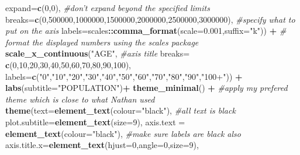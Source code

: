 \documentclass[]{article}
\newenvironment{Shaded}{\begin{snugshade}}{\end{snugshade}}
\newcommand{\KeywordTok}[1]{\textcolor[rgb]{0.13,0.29,0.53}{\textbf{#1}}}
\newcommand{\DataTypeTok}[1]{\textcolor[rgb]{0.13,0.29,0.53}{#1}}
\newcommand{\DecValTok}[1]{\textcolor[rgb]{0.00,0.00,0.81}{#1}}
\newcommand{\FloatTok}[1]{\textcolor[rgb]{0.00,0.00,0.81}{#1}}
\newcommand{\StringTok}[1]{\textcolor[rgb]{0.31,0.60,0.02}{#1}}
\newcommand{\CommentTok}[1]{\textcolor[rgb]{0.56,0.35,0.01}{\textit{#1}}}
\newcommand{\OperatorTok}[1]{\textcolor[rgb]{0.81,0.36,0.00}{\textbf{#1}}}
\newcommand{\NormalTok}[1]{#1}
\begin{document}
\begin{Shaded}
\begin{Highlighting}[]
{                     \DataTypeTok{expand=}\KeywordTok{c}\NormalTok{(}\DecValTok{0}\NormalTok{,}\DecValTok{0}\NormalTok{), }\CommentTok{#don't expand beyond the specified limits}
                     \DataTypeTok{breaks=}\KeywordTok{c}\NormalTok{(}\DecValTok{0}\NormalTok{,}\DecValTok{500000}\NormalTok{,}\DecValTok{1000000}\NormalTok{,}\DecValTok{1500000}\NormalTok{,}\DecValTok{2000000}\NormalTok{,}\DecValTok{2500000}\NormalTok{,}\DecValTok{3000000}\NormalTok{), }\CommentTok{#specify what to put on the axis}
                     \DataTypeTok{labels=}\NormalTok{scales}\OperatorTok{::}\KeywordTok{comma_format}\NormalTok{(}\DataTypeTok{scale=}\FloatTok{0.001}\NormalTok{,}\DataTypeTok{suffix=}\StringTok{"k"}\NormalTok{)) }\OperatorTok{+}\StringTok{ }\CommentTok{# format the displayed numbers using the scales package}
\StringTok{  }\KeywordTok{scale_x_continuous}\NormalTok{(}\StringTok{"AGE"}\NormalTok{, }\CommentTok{#axis title}
                     \DataTypeTok{breaks=} \KeywordTok{c}\NormalTok{(}\DecValTok{0}\NormalTok{,}\DecValTok{10}\NormalTok{,}\DecValTok{20}\NormalTok{,}\DecValTok{30}\NormalTok{,}\DecValTok{40}\NormalTok{,}\DecValTok{50}\NormalTok{,}\DecValTok{60}\NormalTok{,}\DecValTok{70}\NormalTok{,}\DecValTok{80}\NormalTok{,}\DecValTok{90}\NormalTok{,}\DecValTok{100}\NormalTok{),}
                     \DataTypeTok{labels=}\KeywordTok{c}\NormalTok{(}\StringTok{"0"}\NormalTok{,}\StringTok{"10"}\NormalTok{,}\StringTok{"20"}\NormalTok{,}\StringTok{"30"}\NormalTok{,}\StringTok{"40"}\NormalTok{,}\StringTok{"50"}\NormalTok{,}\StringTok{"60"}\NormalTok{,}\StringTok{"70"}\NormalTok{,}\StringTok{"80"}\NormalTok{,}\StringTok{"90"}\NormalTok{,}\StringTok{"100+"}\NormalTok{)) }\OperatorTok{+}
\StringTok{  }\KeywordTok{labs}\NormalTok{(}\DataTypeTok{subtitle=}\StringTok{"POPULATION"}\NormalTok{)}\OperatorTok{+}
\StringTok{  }\KeywordTok{theme_minimal}\NormalTok{() }\OperatorTok{+}\StringTok{ }\CommentTok{#apply my prefered theme which is close to what Nathan used}
\StringTok{  }\KeywordTok{theme}\NormalTok{(}\DataTypeTok{text=}\KeywordTok{element_text}\NormalTok{(}\DataTypeTok{colour=}\StringTok{"black"}\NormalTok{), }\CommentTok{#all text is black}
        \DataTypeTok{plot.subtitle=}\KeywordTok{element_text}\NormalTok{(}\DataTypeTok{size=}\DecValTok{9}\NormalTok{),}
        \DataTypeTok{axis.text =} \KeywordTok{element_text}\NormalTok{(}\DataTypeTok{colour=}\StringTok{"black"}\NormalTok{), }\CommentTok{#make sure labels are black also}
        \DataTypeTok{axis.title.x=}\KeywordTok{element_text}\NormalTok{(}\DataTypeTok{hjust=}\DecValTok{0}\NormalTok{,}\DataTypeTok{angle=}\DecValTok{0}\NormalTok{,}\DataTypeTok{size=}\DecValTok{9}\NormalTok{),}
}
\end{Highlighting}
\end{Shaded}
\end{document}
